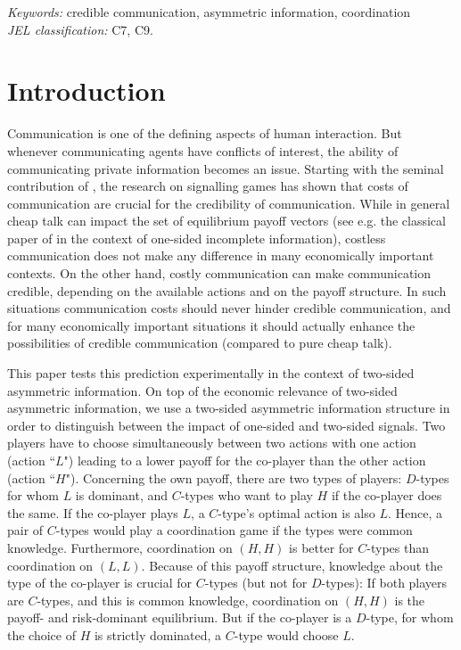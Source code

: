 \documentclass[12pt]{article}
\theoremstyle{break}
\begin{document}
\noindent\textit{Keywords:} credible communication, asymmetric information, coordination\\
\noindent\textit{JEL classification:} C7, C9.

\pagebreak
\section{Introduction}
Communication is one of the defining aspects of human interaction. But whenever communicating agents have conflicts of interest, the ability of communicating private information becomes an issue. Starting with the seminal contribution of \cite{Spence1973}, the research on signalling games has shown that costs of communication are crucial for the credibility of communication. While in general cheap talk can impact the set of equilibrium payoff vectors (see e.g. the classical paper of \cite{Crawford1982} in the context of one-sided incomplete information), costless communication does not make any difference in many economically important contexts. On the other hand, costly communication can make communication credible, depending on the available actions and on the payoff structure. In such situations communication costs should never hinder credible communication, and for many economically important situations it should actually enhance the possibilities of credible communication (compared to pure cheap talk).

This paper tests this prediction experimentally in the context of two-sided asymmetric information. On top of the economic relevance of two-sided asymmetric information, we use a two-sided asymmetric information structure in order to distinguish between the impact of one-sided and two-sided signals. Two players have to choose simultaneously between two actions with one action (action ``$L$") leading to a lower payoff for the co-player than the other action (action ``$H$"). Concerning the own payoff, there are two types of players: $D$-types for whom $L$ is dominant, and $C$-types who want to play $H$ if the co-player does the same. If the co-player plays $L$, a $C$-type's optimal action is also $L$. Hence, a pair of $C$-types would play a coordination game if the types were common knowledge. Furthermore, coordination on $(H,H)$ is better for $C$-types than coordination on $(L,L)$. Because of this payoff structure, knowledge about the type of the co-player is crucial for $C$-types (but not for $D$-types): If both players are $C$-types, and this is common knowledge, coordination on $(H,H)$ is the payoff- and risk-dominant equilibrium. But if the co-player is a $D$-type, for whom the choice of $H$ is strictly dominated, a $C$-type would choose $L$.
\end{document}
